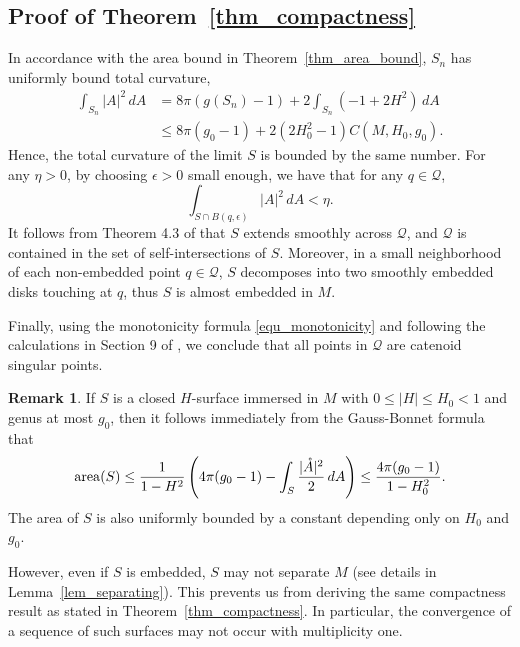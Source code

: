\documentclass[12pt,a4paper]{amsart}
\numberwithin{equation}{section}
\theoremstyle{plain}
\theoremstyle{named}
\theoremstyle{definition}
\newtheorem{Rem}[Th]{Remark}
\newcommand{\area}{{\rm{area}}}
\begin{document}
        

\subsection{Proof of Theorem~\ref{thm_compactness}}
 In accordance with the area bound in Theorem~\ref{thm_area_bound}, $S_n$ has uniformly bound total curvature, \begin{align*}
        \int_{S_n}|A|^2\,dA &= 8\pi(g(S_n)-1)+2\int_{S_n}(-1+2H^2)\,dA\\
        &\leq 8\pi(g_0-1)+2(2H_0^2-1)C(M,H_0,g_0).
    \end{align*}
    Hence, the total curvature of the limit $S$ is bounded by the same number. For any $\eta>0$, by choosing $\epsilon>0$ small enough, we have that for any $q\in \mathcal{Q}$, \begin{equation*}
        \int_{S\cap B(q,\epsilon)}|A|^2\,dA<\eta.
    \end{equation*}
    It follows from Theorem 4.3 of \cite{Sun} that $S$ extends smoothly across $\mathcal{Q}$, and $\mathcal{Q}$ is contained in the set of self-intersections of $S$. Moreover, in a small neighborhood of each non-embedded point $q\in\mathcal{Q}$, $S$ decomposes into two smoothly embedded disks touching at $q$, thus $S$ is almost embedded in $M$. 

    Finally, using the monotonicity formula \eqref{equ_monotonicity} and following the calculations in Section 9 of \cite{Meeks-Tinaglia}, we conclude that all points in $\mathcal{Q}$ are catenoid singular points. 

\begin{Rem}
If $S$ is a closed $H$-surface immersed in $M$ with $0\leq |H|\leq H_0< 1$ and genus at most $g_0$, then it follows immediately from the Gauss-Bonnet formula that \begin{equation*}
    \area(S)\leq \frac{1}{1-H^2}\left(4\pi(g_0-1)-\int_S\frac{|\mathring{A}|^2}{2}\,dA\right)\leq \frac{4\pi(g_0-1)}{1-H_0^2}.
\end{equation*}
The area of $S$ is also uniformly bounded by a constant depending only on $H_0$ and $g_0$.

However, even if $S$ is embedded, $S$ may not separate $M$ (see details in Lemma~\ref{lem_separating}). This prevents us from deriving the same compactness result as stated in Theorem~\ref{thm_compactness}. In particular, the convergence of a sequence of such surfaces may not occur with multiplicity one.
\end{Rem}
\end{document}
